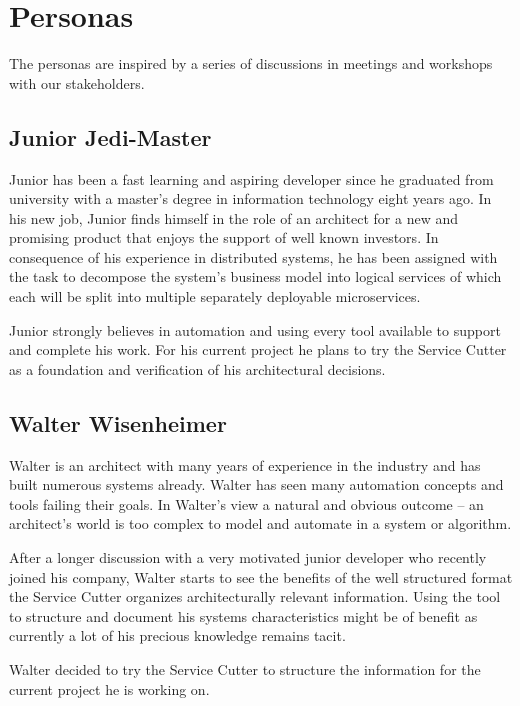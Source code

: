 
\section{Personas}

The personas are inspired by a series of discussions in meetings and workshops with our stakeholders.

\subsection{Junior Jedi-Master}

Junior has been a fast learning and aspiring developer since he graduated from university with a master's degree in information technology eight years ago. In his new job, Junior finds himself in the role of an architect for a new and promising product that enjoys the support of well known investors. In consequence of his experience in distributed systems, he has been assigned with the task to decompose the system's business model into logical services of which each will be split into multiple separately deployable microservices. 

Junior strongly believes in automation and using every tool available to support and complete his work. For his current project he plans to try the Service Cutter as a foundation and verification of his architectural decisions. 


\subsection{Walter Wisenheimer}

Walter is an architect with many years of experience in the industry and has built numerous systems already. Walter has seen many automation concepts and tools failing their goals. In Walter's view a natural and obvious outcome -- an architect's world is too complex to model and automate in a system or algorithm. 

After a longer discussion with a very motivated junior developer who recently joined his company, Walter starts to see the benefits of the well structured format the Service Cutter organizes architecturally relevant information. Using the tool to structure and document his systems characteristics might be of benefit as currently a lot of his precious knowledge remains tacit\cite{zimmermann2015architectural}. 

Walter decided to try the Service Cutter to structure the information for the current project he is working on.


